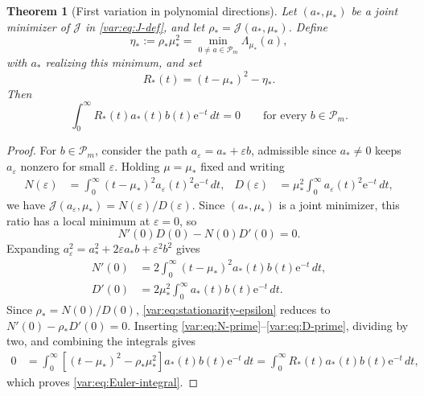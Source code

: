 \documentclass[10pt,a4paper]{amsart}
\newtheorem{theorem}{Theorem}
\newcommand{\Pcal}{\mathcal P}
\newcommand{\e}{\mathrm e}
\begin{document}
\begin{theorem}[First variation in polynomial directions]\label{var:thm:first-variation}
Let \((a_*,\mu_*)\) be a joint minimizer of \(\mathcal{J}\) in \eqref{var:eq:J-def}, and let \(\rho_*=\mathcal{J}(a_*,\mu_*)\). Define
\begin{equation}\label{var:eq:eta-def}
    \eta_*
    :=\rho_*\mu_*^2
    =\min_{0\ne a\in\Pcal_m}\Lambda_{\mu_*}(a),
\end{equation}
with $a_*$ realizing this minimum, and set
\begin{equation}\label{var:eq:R-def}
    R_*(t)=(t-\mu_*)^2-\eta_*.
\end{equation}
Then
\begin{equation}\label{var:eq:Euler-integral}
    \int_0^\infty R_*(t)a_*(t)b(t)\e^{-t}\,dt=0
    \qquad
    \text{for every }b\in\Pcal_m.
\end{equation}
\end{theorem}

\begin{proof}
For \(b\in\Pcal_m\), consider the path \(a_\varepsilon=a_*+\varepsilon b\), admissible since \(a_*\ne0\) keeps \(a_\varepsilon\) nonzero for small \(\varepsilon\). Holding \(\mu=\mu_*\) fixed and writing
\begin{align*}
    N(\varepsilon)
    &=\int_0^\infty
      (t-\mu_*)^2a_\varepsilon(t)^2\e^{-t}\,dt,
      &
    D(\varepsilon)
    &=\mu_*^2\int_0^\infty
      a_\varepsilon(t)^2\e^{-t}\,dt,
\end{align*}
we have \(\mathcal{J}(a_\varepsilon,\mu_*)=N(\varepsilon)/D(\varepsilon)\). Since \((a_*,\mu_*)\) is a joint minimizer, this ratio has a local minimum at \(\varepsilon=0\), so
\begin{equation}\label{var:eq:stationarity-epsilon}
    N'(0)D(0)-N(0)D'(0)=0.
\end{equation}
Expanding \(a_\varepsilon^2=a_*^2+2\varepsilon a_*b+\varepsilon^2b^2\) gives
\begin{align}
    N'(0)
    &=2\int_0^\infty
      (t-\mu_*)^2a_*(t)b(t)\e^{-t}\,dt,
      \label{var:eq:N-prime}\\
    D'(0)
    &=2\mu_*^2\int_0^\infty
      a_*(t)b(t)\e^{-t}\,dt.
      \label{var:eq:D-prime}
\end{align}
Since \(\rho_*=N(0)/D(0)\), \eqref{var:eq:stationarity-epsilon} reduces to \(N'(0)-\rho_*D'(0)=0\). Inserting \eqref{var:eq:N-prime}--\eqref{var:eq:D-prime}, dividing by two, and combining the integrals gives
\begin{align*}
    0
    &=\int_0^\infty
      \left[(t-\mu_*)^2-\rho_*\mu_*^2\right]
      a_*(t)b(t)\e^{-t}\,dt
    =\int_0^\infty
      R_*(t)a_*(t)b(t)\e^{-t}\,dt,
\end{align*}
which proves \eqref{var:eq:Euler-integral}.
\end{proof}
\end{document}
